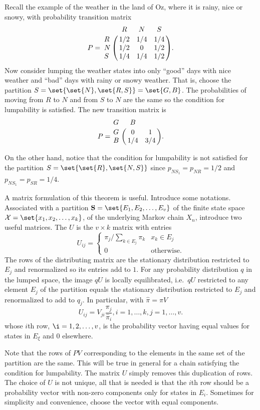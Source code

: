 \documentclass[12pt]{article}
\begin{document}
\begin{example}
  Recall the example of the weather in the land of Oz, where it is
  rainy, nice or snowy, with probability transition matrix
      \[
        P = \bordermatrix{ & R & N & S \cr
        R & 1/2 & 1/4 & 1/4 \cr
        N & 1/2 & 0 & 1/2 \cr
        S & 1/4 & 1/4 & 1/2 }.
    \]
  Now consider lumping the weather states into only ``good'' days with
  nice weather and ``bad'' days with rainy or snowy weather.  That is,
  choose the partition $S = \set{ \set{N}, \set{R,S}} = \set{G, B}$.
  The probabilities of moving from $R$ to $N$ and from $S$ to $N$ are
  the same so the condition for lumpability is satisfied.  The new
  transition matrix is
  \[
    P = \bordermatrix{ G & B \cr
    G & 0 & 1 \cr
    B & 1/4 & 3/4}.
\]

On the other hand, notice that the condition for lumpability is not
satisfied for the partition $S = \set{ \set{R}, \set{N, S}}$ since
$p_{N S_1} = p_{NR} = 1/2$ and $p_{N S_1} = p_{SR} = 1/4$.
\end{example}

A matrix formulation of this theorem is useful.
Introduce some notations.
Associated with a partition \( \mathbf{S} = \set{E_1,  E_2, \dots,
  E_v} \) of the finite state space
\( \mathcal{X} = \set{x_1, x_2, \dots,  x_k}\), of the underlying Markov chain $X_n$, introduce
two useful matrices. The  $U$ is the $v \times k$ matrix with entries
\[
  U_{ij} =
  \begin{cases}
    \pi_j/\sum_{k \in E_j} \pi_k & x_k \in E_j \\
    0                            & \text{otherwise}.
  \end{cases}
\]
The rows of the distributing matrix are the stationary
distribution restricted to $E_j$ and renormalized so its entries add
to $1$.   For any probability distribution $q$ in the lumped
space, the image $qU$ is locally equilibrated, i.e.\ $qU$ restricted
to any element $E_j$ of the partition equals the stationary
distribution restricted to $E_j$ and renormalized to add to $q_j$.  In
particular, with $\hat{\pi} = \pi V$
\[
  U_{ij} = V_{ji} \frac{\pi_j}{\hat{\pi}_{i}}, i = 1, \dots, k, j = 1,
  \dots, v.
\]
whose $i$th
row, \( \i =
1, 2, \dots, v \), is the probability vector having equal values for states
in $E_{\xi}$ and $0$ elsewhere.

Note that the rows of $PV$ corresponding to the elements in the same
set of the partition are the same.  This will be true in general for a
chain satisfying the condition for lumpability.  The matrix $U$ simply
removes this duplication of rows.  The choice of $U$ is not unique,
all that is needed is that the $i$th row should be a probability
vector with non-zero components only for states in $E_i$.  Sometimes
for simplicity and convenience, choose the vector with equal components.
\end{document}
